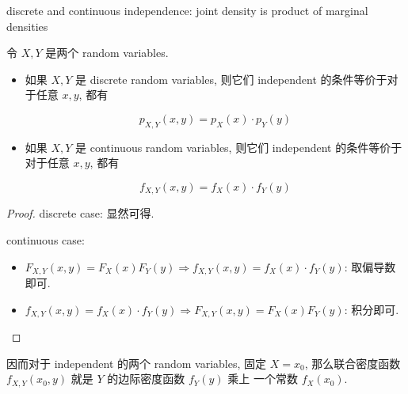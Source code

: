 \documentclass{qlnotes-export}
\begin{document}
\begin{theorem}{discrete and continuous independence: joint density is product of
marginal densities}\label{thm-03-joint-conditional-distribution-discrete-and-continuous-independence-joint-density-is-product-of}

令 \(X,Y\) 是两个 random variables.

\begin{itemize}
\item
  如果 \(X,Y\) 是 discrete random variables, 则它们 independent 的条件等价于对于任意 \(x,y\), 都有

  \[p_{X,Y}(x,y) = p_{X}(x) \cdot p_{Y}(y)\]
\item
  如果 \(X,Y\) 是 continuous random variables, 则它们 independent 的条件等价于对于任意 \(x,y\), 都有

  \[f_{X,Y}(x,y) = f_{X}(x) \cdot f_{Y}(y)\]
\end{itemize}

\end{theorem}

\begin{proof}

discrete case: 显然可得.

continuous case:

\begin{itemize}
\item
  \(F_{X,Y}(x,y) = F_{X}(x)F_{Y}(y)\Longrightarrow f_{X,Y}(x,y) = f_{X}(x) \cdot f_{Y}(y)\): 取偏导数即可.
\item
  \(f_{X,Y}(x,y) = f_{X}(x) \cdot f_{Y}(y)\Longrightarrow F_{X,Y}(x,y) = F_{X}(x)F_{Y}(y)\): 积分即可.
\end{itemize}

\end{proof}

因而对于 independent 的两个 random variables, 固定 \(X = x_{0}\), 那么联合密度函数 \(f_{X,Y}(x_{0},y)\) 就是 \(Y\) 的边际密度函数 \(f_{Y}(y)\) 乘上 一个常数 \(f_{X}(x_{0})\).\\
\end{document}
